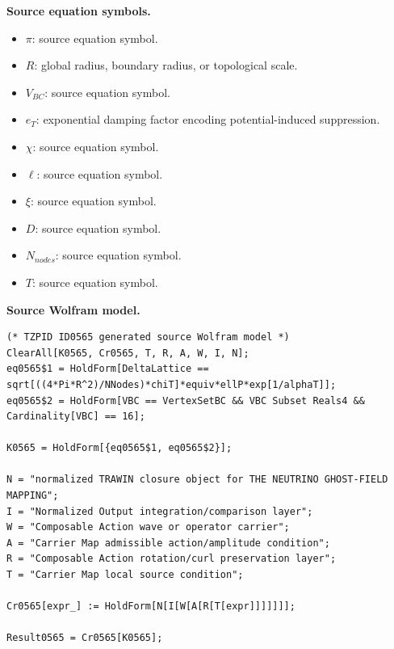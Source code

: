 \begin{minipage}[t]{0.49\linewidth}
\begingroup
\small
\raggedright
\textbf{Source equation symbols.}\par
\begin{itemize}[leftmargin=1.35em,itemsep=1pt,topsep=1pt,parsep=0pt]
    \item $\pi$: source equation symbol.
    \item $R$: global radius, boundary radius, or topological scale.
    \item $V_{BC}$: source equation symbol.
    \item $e_T$: exponential damping factor encoding potential-induced suppression.
    \item $\chi$: source equation symbol.
    \item $\ell$: source equation symbol.
    \item $\xi$: source equation symbol.
    \item $D$: source equation symbol.
    \item $N_{nodes}$: source equation symbol.
    \item $T$: source equation symbol.
\end{itemize}
\endgroup
\end{minipage}\hfill
\begin{minipage}[t]{0.47\linewidth}
\begingroup
\scriptsize
\raggedright
\textbf{Source Wolfram model.}\par
\begin{Verbatim}[fontsize=\tiny,breaklines=true,breakanywhere=true]
(* TZPID ID0565 generated source Wolfram model *)
ClearAll[K0565, Cr0565, T, R, A, W, I, N];
eq0565$1 = HoldForm[DeltaLattice == sqrt[((4*Pi*R^2)/NNodes)*chiT]*equiv*ellP*exp[1/alphaT]];
eq0565$2 = HoldForm[VBC == VertexSetBC && VBC Subset Reals4 && Cardinality[VBC] == 16];

K0565 = HoldForm[{eq0565$1, eq0565$2}];

N = "normalized TRAWIN closure object for THE NEUTRINO GHOST-FIELD MAPPING";
I = "Normalized Output integration/comparison layer";
W = "Composable Action wave or operator carrier";
A = "Carrier Map admissible action/amplitude condition";
R = "Composable Action rotation/curl preservation layer";
T = "Carrier Map local source condition";

Cr0565[expr_] := HoldForm[N[I[W[A[R[T[expr]]]]]]];

Result0565 = Cr0565[K0565];
\end{Verbatim}
\endgroup
\end{minipage}


